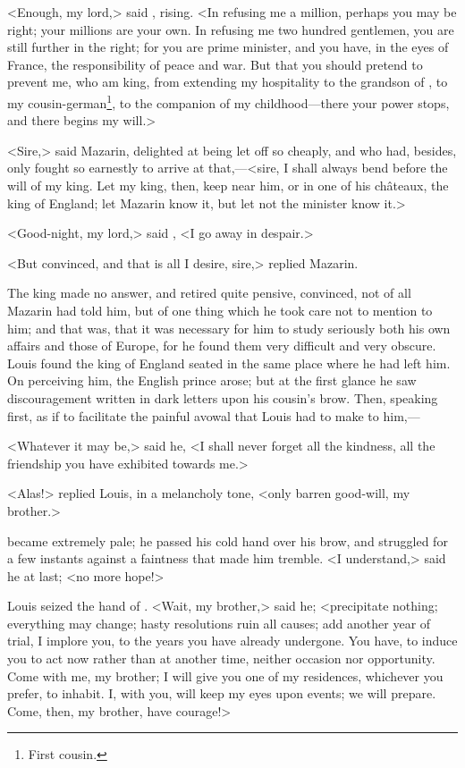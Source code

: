 <Enough, my lord,> said , rising. <In refusing me a million, perhaps you may be right; your millions are your own. In refusing me two hundred gentlemen, you are still further in the right; for you are prime minister, and you have, in the eyes of France, the responsibility of peace and war. But that you should pretend to prevent me, who am king, from extending my hospitality to the grandson of , to my cousin-german\footnote{First cousin.}, to the companion of my childhood—there your power stops, and there begins my will.>

<Sire,> said Mazarin, delighted at being let off so cheaply, and who had, besides, only fought so earnestly to arrive at that,—<sire, I shall always bend before the will of my king. Let my king, then, keep near him, or in one of his châteaux, the king of England; let Mazarin know it, but let not the minister know it.>

<Good-night, my lord,> said , <I go away in despair.>

<But convinced, and that is all I desire, sire,> replied Mazarin.

The king made no answer, and retired quite pensive, convinced, not of all Mazarin had told him, but of one thing which he took care not to mention to him; and that was, that it was necessary for him to study seriously both his own affairs and those of Europe, for he found them very difficult and very obscure. Louis found the king of England seated in the same place where he had left him. On perceiving him, the English prince arose; but at the first glance he saw discouragement written in dark letters upon his cousin's brow. Then, speaking first, as if to facilitate the painful avowal that Louis had to make to him,—

<Whatever it may be,> said he, <I shall never forget all the kindness, all the friendship you have exhibited towards me.>

<Alas!> replied Louis, in a melancholy tone, <only barren good-will, my brother.>

 became extremely pale; he passed his cold hand over his brow, and struggled for a few instants against a faintness that made him tremble. <I understand,> said he at last; <no more hope!>

Louis seized the hand of . <Wait, my brother,> said he; <precipitate nothing; everything may change; hasty resolutions ruin all causes; add another year of trial, I implore you, to the years you have already undergone. You have, to induce you to act now rather than at another time, neither occasion nor opportunity. Come with me, my brother; I will give you one of my residences, whichever you prefer, to inhabit. I, with you, will keep my eyes upon events; we will prepare. Come, then, my brother, have courage!>

